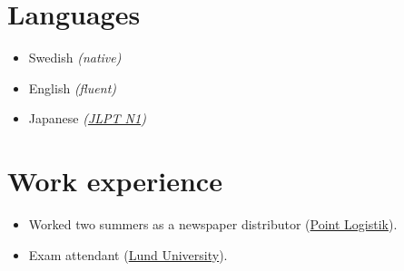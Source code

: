 \documentclass[11pt]{article}
\begin{document}
\section{Languages}
\begin{itemize}
    \item Swedish \textit{(native)}
    \item English \textit{(fluent)}
    \item Japanese \textit{(\href{https://www.jlpt.jp/e/about/levelsummary.html}{JLPT N1})}
\end{itemize}

\section{Work experience}
\begin{itemize}
    \item Worked two summers as a newspaper distributor (\href{https://www.pointlogistik.se/}{Point Logistik}).
    \item Exam attendant (\href{https://www.lth.se/english/}{Lund University}).
\end{itemize}
\end{document}
